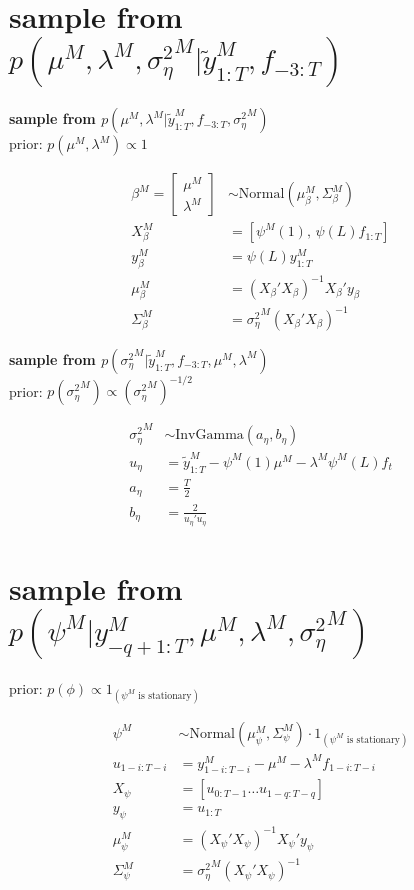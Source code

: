 \section{sample from $p(\mu^M, \lambda^M, {\sigma^2_\eta}^M|\tilde{y}^M_{1:T}, f_{-3:T})$}

\textbf{sample from $p(\mu^M, \lambda^M|\tilde{y}^M_{1:T}, f_{-3:T}, {\sigma^2_\eta}^M)$}\\

\noindent prior: $p(\mu^M, \lambda^M) \propto 1$

\begin{align}
\beta^M = \begin{bmatrix} \mu^M \\ \lambda^M \end{bmatrix} &\sim \mathrm{Normal}\left(\mu_\beta^M, \Sigma_\beta^M \right) \\
X_\beta^M &= [\psi^M(1),\,\psi(L)f_{1:T}] \\
y_\beta^M &= \psi(L)y^M_{1:T} \\
\mu_\beta^M &= (X_\beta'X_\beta)^{-1}X_\beta'y_\beta \\
\Sigma_\beta^M &= {\sigma_\eta^2}^M (X_\beta'X_\beta)^{-1}
\end{align}

\noindent \textbf{sample from $p({\sigma^2_\eta}^M|\tilde{y}^M_{1:T}, f_{-3:T}, \mu^M, \lambda^M)$}\\

\noindent prior: $p({\sigma^2_\eta}^M) \propto ({\sigma^2_\eta}^M)^{-1/2}$

\begin{align}
{\sigma^2_\eta}^M &\sim \mathrm{InvGamma}(a_\eta, b_\eta) \\
u_\eta &=  \tilde{y}^M_{1:T} - \psi^M(1)\mu^M - \lambda^M \psi^M(L)f_t\\
a_\eta &= \frac{T}{2} \\
b_\eta &= \frac{2}{u_\eta'u_\eta}
\end{align}

\section{sample from $p(\psi^M|y^M_{-q+1:T}, \mu^M, \lambda^M, {\sigma^2_\eta}^M)$}

prior: $p(\phi) \propto 1_{(\psi^M\text{ is stationary})}$

\begin{align}
\psi^M &\sim \mathrm{Normal}(\mu_\psi^M, \Sigma_\psi^M) \cdot 1_{(\psi^M\text{ is stationary})}\\
u_{1-i:T-i} &= y^M_{1-i:T-i} - \mu^M - \lambda^M f_{1-i:T-i} \\
X_\psi &= [u_{0:T-1} \dots u_{1-q:T-q}] \\
y_\psi &= u_{1:T} \\
\mu^M_\psi &= {(X_\psi' X_\psi)}^{-1} X_\psi' y_\psi \\ %
\Sigma^M_\psi &= {\sigma_\eta^2}^M{(X_\psi' X_\psi)}^{-1}
\end{align}

